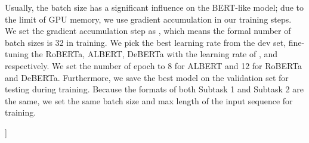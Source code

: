 \documentclass[11pt,a4paper]{article}
\begin{document}
Usually, the batch size has a significant influence on the BERT-like model; due to the limit of GPU memory, we use gradient accumulation in our training steps.
We set the gradient accumulation step as , which means the formal number of batch sizes is 32 in training.
We pick the best learning rate from the dev set, fine-tuning the RoBERTa, ALBERT, DeBERTa with the learning rate of ,  and  respectively.
We set the number of epoch to 8 for ALBERT and 12 for RoBERTa and DeBERTa.
Furthermore, we save the best model on the validation set for testing during training.
Because the formats of both Subtask 1 and Subtask 2 are the same, we set the same batch size and max length of the input sequence for training. 

\begin{table}[ht]
\centering
\begin{minipage}[t]{0.48\textwidth}
  \centering
  \makeatletter{}\makeatother
  \caption{\label{font-table}Results (Accuracy) on  Subtask 1.}
  \label{tb:Results1}
\end{minipage}
\12pt]
\begin{minipage}[t]{0.48\textwidth}
  \centering
  \makeatletter{}\makeatother
\end{minipage}
\end{table}
\end{document}

